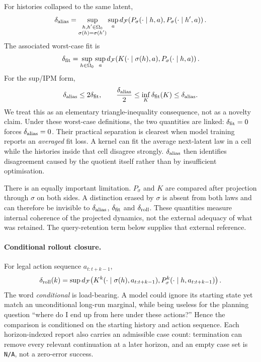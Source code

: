 \documentclass[10pt]{article}
\newcommand{\dF}{d_{\mathcal F}}
\newcommand{\NA}{\texttt{N/A}}
\begin{document}
For histories collapsed to the same latent,
\[
\delta_{\rm alias}
=
\sup_{\substack{h,h'\in\Omega_0\\\sigma(h)=\sigma(h')}}
\sup_a
\dF\!\left(P_\sigma(\cdot\mid h,a),P_\sigma(\cdot\mid h',a)\right).
\]
The associated worst-case fit is
\[
\delta_{\rm fit}
=
\sup_{h\in\Omega_0}\sup_a
\dF\!\left(K(\cdot\mid\sigma(h),a),P_\sigma(\cdot\mid h,a)\right).
\]
For the sup/IPM form,
\[
\delta_{\rm alias}\le 2\delta_{\rm fit},
\qquad
\frac{\delta_{\rm alias}}2
\le \inf_K\delta_{\rm fit}(K)
\le \delta_{\rm alias}.
\]
We treat this as an elementary triangle-inequality consequence, not as a novelty claim. Under these worst-case definitions, the two quantities are linked: $\delta_{\rm fit}=0$ forces $\delta_{\rm alias}=0$. Their practical separation is clearest when model training reports an \emph{averaged} fit loss. A kernel can fit the average next-latent law in a cell while the histories inside that cell disagree strongly. $\delta_{\rm alias}$ then identifies disagreement caused by the quotient itself rather than by insufficient optimisation.

There is an equally important limitation. $P_\sigma$ and $K$ are compared after projection through $\sigma$ on both sides. A distinction erased by $\sigma$ is absent from both laws and can therefore be invisible to $\delta_{\rm alias}$, $\delta_{\rm fit}$ and $\delta_{\rm roll}$. These quantities measure internal coherence of the projected dynamics, not the external adequacy of what was retained. The query-retention term below supplies that external reference.

\paragraph{Conditional rollout closure.}
For legal action sequence $a_{t:t+k-1}$,
\[
\delta_{\rm roll}(k)
=
\sup
\dF\!\left(
K^k(\cdot\mid\sigma(h),a_{t:t+k-1}),
P_\sigma^k(\cdot\mid h,a_{t:t+k-1})
\right).
\]
The word \emph{conditional} is load-bearing. A model could ignore its starting state yet match an unconditional long-run marginal, while being useless for the planning question ``where do I end up from here under these actions?'' Hence the comparison is conditioned on the starting history and action sequence. Each horizon-indexed report also carries an admissible case count: termination can remove every relevant continuation at a later horizon, and an empty case set is \NA, not a zero-error success.
\end{document}
